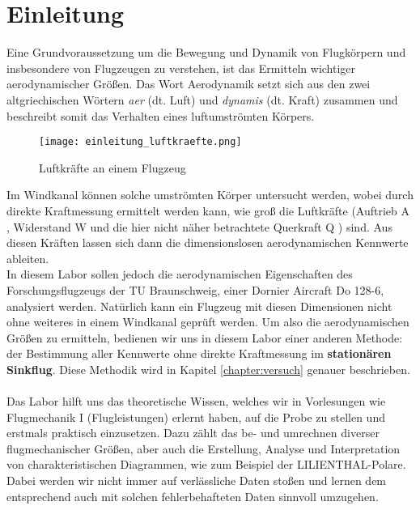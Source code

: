 \chapter{Einleitung}
\label{chapter:einleitung}

Eine Grundvoraussetzung um die Bewegung und Dynamik von Flugkörpern und insbesondere von Flugzeugen zu verstehen, ist das Ermitteln wichtiger aerodynamischer Größen. Das Wort Aerodynamik setzt sich aus den zwei altgriechischen Wörtern \textit{aer} (dt. Luft) und \textit{dynamis} (dt. Kraft) zusammen und beschreibt somit das Verhalten eines luftumströmten Körpers.

\begin{figure}[h] 
	\centering
	\texttt{[image: einleitung\_luftkraefte.png]}
	\caption{Luftkräfte an einem Flugzeug \cite{labor-skript}}
	\label{figure:luftkraefte}
\end{figure}

\noindent Im Windkanal können solche umströmten Körper untersucht werden, wobei durch direkte Kraftmessung ermittelt werden kann, wie groß die Luftkräfte (Auftrieb A , Widerstand W  und die hier nicht näher betrachtete Querkraft Q ) sind. Aus diesen Kräften lassen sich dann die dimensionslosen aerodynamischen Kennwerte ableiten.\\
In diesem Labor sollen jedoch die aerodynamischen Eigenschaften des Forschungsflugzeugs der TU Braunschweig, einer Dornier Aircraft Do 128-6, analysiert werden. Natürlich kann ein Flugzeug mit diesen Dimensionen nicht ohne weiteres in einem Windkanal geprüft werden. Um also die aerodynamischen Größen zu ermitteln, bedienen wir uns in diesem Labor einer anderen Methode: der Bestimmung aller Kennwerte ohne direkte Kraftmessung im \textbf{stationären Sinkflug}. Diese Methodik wird in Kapitel \ref{chapter:versuch} genauer beschrieben.\\\\
Das Labor hilft uns das theoretische Wissen, welches wir in Vorlesungen wie Flugmechanik I (Flugleistungen) erlernt haben, auf die Probe zu stellen und erstmals praktisch einzusetzen. Dazu zählt das be- und umrechnen diverser flugmechanischer Größen, aber auch die Erstellung, Analyse und Interpretation von charakteristischen Diagrammen, wie zum Beispiel der LILIENTHAL-Polare. Dabei werden wir nicht immer auf verlässliche Daten stoßen und lernen dem entsprechend auch mit solchen fehlerbehafteten Daten sinnvoll umzugehen.

